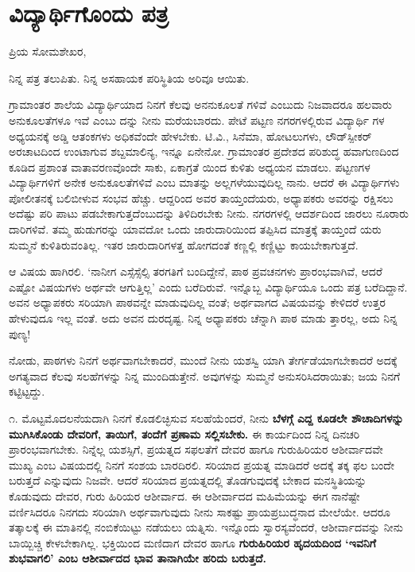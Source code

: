 
\chapter{ವಿದ್ಯಾರ್ಥಿಗೊಂದು ಪತ್ರ}

ಪ್ರಿಯ ಸೋಮಶೇಖರ,

ನಿನ್ನ ಪತ್ರ ತಲುಪಿತು. ನಿನ್ನ ಅಸಹಾಯಕ ಪರಿಸ್ಥಿತಿಯ ಅರಿವೂ ಆಯಿತು.

ಗ್ರಾಮಾಂತರ ಶಾಲೆಯ ವಿದ್ಯಾರ್ಥಿಯಾದ ನಿನಗೆ ಕೆಲವು ಅನನುಕೂಲತೆ ಗಳಿವೆ ಎಂಬುದು ನಿಜವಾದರೂ ಹಲವಾರು ಅನುಕೂಲತೆಗಳೂ ಇವೆ ಎಂಬು ದನ್ನು ನೀನು ಮರೆಯಬಾರದು. ಪೇಟೆ ಪಟ್ಟಣ ನಗರಗಳಲ್ಲಿರುವ ವಿದ್ಯಾರ್ಥಿ ಗಳ ಅಧ್ಯಯನಕ್ಕೆ ಅಡ್ಡಿ ಆತಂಕಗಳು ಅಧಿಕವೆಂದೇ ಹೇಳಬೇಕು. ಟಿ.ವಿ., ಸಿನೆಮಾ, ಹೋಟಲುಗಳು, ಲೌಡ್​ಸ್ಪೀಕರ್ ಅರಚಾಟದಿಂದ ಉಂಟಾಗುವ ಶಬ್ದಮಾಲಿನ್ಯ, ಇನ್ನೂ ಏನೇನೋ. ಗ್ರಾಮಾಂತರ ಪ್ರದೇಶದ ಪರಿಶುದ್ಧ ಹವಾಗುಣದಿಂದ ಕೂಡಿದ ಪ್ರಶಾಂತ ವಾತಾವರಣವೊಂದೇ ಸಾಕು, ಏಕಾಗ್ರತೆ ಯಿಂದ ಕುಳಿತು ಅಧ್ಯಯನ ಮಾಡಲು. ಪಟ್ಟಣಗಳ ವಿದ್ಯಾರ್ಥಿಗಳಿಗೆ ಅನೇಕ ಅನುಕೂಲತೆಗಳಿವೆ ಎಂಬ ಮಾತನ್ನು ಅಲ್ಲಗಳೆಯುವುದಿಲ್ಲ ನಾನು. ಆದರೆ ಈ ವಿದ್ಯಾರ್ಥಿಗಳು ಪೋಲೀತನಕ್ಕೆ ಬಲಿಬೀಳುವ ಸಂಭವ ಹೆಚ್ಚು. ಆದ್ದರಿಂದ ಅವರ ತಾಯ್ತಂದೆಯರು, ಅಧ್ಯಾಪಕರು ಅವರನ್ನು ರಕ್ಷಿಸಲು ಅದೆಷ್ಟು ಪರಿ ಪಾಟು ಪಡಬೇಕಾಗುತ್ತದೆಂಬುದನ್ನು ತಿಳಿದಿರಬೇಕು ನೀನು. ನಗರಗಳಲ್ಲಿ ಆದರ್ಶದಿಂದ ಜಾರಲು ನೂರಾರು ದಾರಿಗಳಿವೆ. ತಮ್ಮ ಹುಡುಗರನ್ನು ಯಾವದೋ ಒಂದು ಜಾರುದಾರಿಯಿಂದ ತಪ್ಪಿಸಿದ ಮಾತ್ರಕ್ಕೆ ತಾಯ್ತಂದೆ ಯರು ಸುಮ್ಮನೆ ಕುಳಿತಿರುವಂತಿಲ್ಲ. ಇತರ ಜಾರುದಾರಿಗಳತ್ತ ಹೋಗದಂತೆ ಕಣ್ಣಲ್ಲಿ ಕಣ್ಣಿಟ್ಟು ಕಾಯಬೇಕಾಗುತ್ತದೆ.

ಆ ವಿಷಯ ಹಾಗಿರಲಿ. ‘ನಾನೀಗ ಎಸ್ಸೆಸ್ಸೆಲ್ಸಿ ತರಗತಿಗೆ ಬಂದಿದ್ದೇನೆ, ಪಾಠ ಪ್ರವಚನಗಳು ಪ್ರಾರಂಭವಾಗಿವೆ, ಆದರೆ ಎಷ್ಟೋ ವಿಷಯಗಳು ಅರ್ಥವೇ ಆಗುತ್ತಿಲ್ಲ’ ಎಂದು ಬರೆದಿರುವೆ. ಇನ್ನೊಬ್ಬ ವಿದ್ಯಾರ್ಥಿಯೂ ಒಂದು ಪತ್ರ ಬರೆದಿದ್ದಾನೆ. ಅವನ ಅಧ್ಯಾಪಕರು ಸರಿಯಾಗಿ ಪಾಠವನ್ನೇ ಮಾಡುವುದಿಲ್ಲ ವಂತೆ; ಅರ್ಥವಾಗದ ವಿಷಯವನ್ನು ಕೇಳಿದರೆ ಉತ್ತರ ಹೇಳುವುದೂ ಇಲ್ಲ ವಂತೆ. ಅದು ಅವನ ದುರದೃಷ್ಟ. ನಿನ್ನ ಅಧ್ಯಾಪಕರು ಚೆನ್ನಾಗಿ ಪಾಠ ಮಾಡು ತ್ತಾರಲ್ಲ, ಅದು ನಿನ್ನ ಪುಣ್ಯ!

ನೋಡು, ಪಾಠಗಳು ನಿನಗೆ ಅರ್ಥವಾಗಬೇಕಾದರೆ, ಮುಂದೆ ನೀನು ಯಶಸ್ವಿ ಯಾಗಿ ತೇರ್ಗಡೆಯಾಗಬೇಕಾದರೆ ಅದಕ್ಕೆ ಅಗತ್ಯವಾದ ಕೆಲವು ಸಲಹೆಗಳನ್ನು ನಿನ್ನ ಮುಂದಿಡುತ್ತೇನೆ. ಅವುಗಳನ್ನು ಸುಮ್ಮನೆ ಅನುಸರಿಸಿದರಾಯಿತು; ಜಯ ನಿನಗೆ ಕಟ್ಟಿಟ್ಟದ್ದು.

೧. ಮೊಟ್ಟಮೊದಲನೆಯದಾಗಿ ನಿನಗೆ ಕೊಡಲಿಚ್ಛಿಸುವ ಸಲಹೆಯೆಂದರೆ, ನೀನು \textbf{ಬೆಳಗ್ಗೆ ಎದ್ದ ಕೂಡಲೇ ಶೌಚಾದಿಗಳನ್ನು ಮುಗಿಸಿಕೊಂಡು ದೇವರಿಗೆ, ತಾಯಿಗೆ, ತಂದೆಗೆ ಪ್ರಣಾಮ ಸಲ್ಲಿಸಬೇಕು.} ಈ ಕಾರ್ಯದಿಂದ ನಿನ್ನ ದಿನಚರಿ ಪ್ರಾರಂಭವಾಗಬೇಕು. ನಿನ್ನೆಲ್ಲ ಯಶಸ್ಸಿಗೆ, ಪ್ರಯತ್ನದ ಸಫಲತೆಗೆ ದೇವರ ಹಾಗೂ ಗುರುಹಿರಿಯರ ಆಶೀರ್ವಾದವೇ ಮುಖ್ಯ ಎಂಬ ವಿಷಯದಲ್ಲಿ ನಿನಗೆ ಸಂಶಯ ಬಾರದಿರಲಿ. ಸರಿಯಾದ ಪ್ರಯತ್ನ ಮಾಡಿದರೆ ಅದಕ್ಕೆ ತಕ್ಕ ಫಲ ಬಂದೇ ಬರುತ್ತದೆ ಎನ್ನುವುದು ನಿಜವೇ. ಆದರೆ ಸರಿಯಾದ ಪ್ರಯತ್ನದಲ್ಲಿ ತೊಡಗುವುದಕ್ಕೆ ಬೇಕಾದ ಮನಸ್ಥಿತಿಯನ್ನು ಕೊಡುವುದು ದೇವರ, ಗುರು ಹಿರಿಯರ ಆಶೀರ್ವಾದ. ಈ ಆಶೀರ್ವಾದದ ಮಹಿಮೆಯನ್ನು ಈಗ ನಾನೆಷ್ಟೇ ವರ್ಣಿಸಿದರೂ ನಿನಗದು ಸರಿಯಾಗಿ ಅರ್ಥವಾಗುವುದು ನೀನು ಸಾಕಷ್ಟು ಪ್ರಾಯಪ್ರಬುದ್ಧನಾದ ಮೇಲೆಯೇ. ಆದರೂ ತತ್ಕಾಲಕ್ಕೆ ಈ ಮಾತಿನಲ್ಲಿ ನಂಬಿಕೆಯಿಟ್ಟು ನಡೆಯಲು ಯತ್ನಿಸು. ಇನ್ನೊಂದು ಸ್ವಾರಸ್ಯವೆಂದರೆ, ಆಶೀರ್ವಾದವನ್ನು ನೀನು ಬಾಯ್ಬಿಚ್ಚಿ ಕೇಳಬೇಕಾಗಿಲ್ಲ. ಭಕ್ತಿಯಿಂದ ಮಣಿದಾಗ ದೇವರ ಹಾಗೂ \textbf{ಗುರುಹಿರಿಯರ ಹೃದಯದಿಂದ ‘ಇವನಿಗೆ ಶುಭವಾಗಲಿ’ ಎಂಬ ಆಶೀರ್ವಾದದ ಭಾವ ತಾನಾಗಿಯೇ ಹರಿದು ಬರುತ್ತದೆ.}

